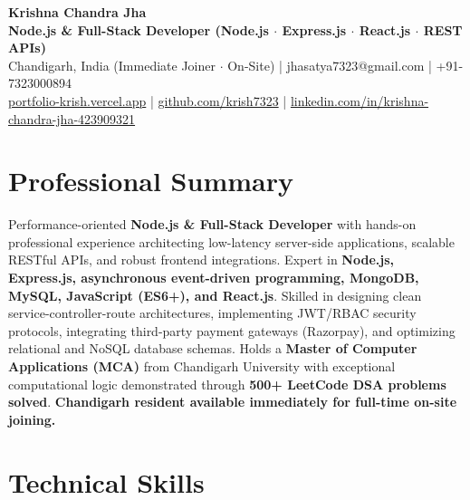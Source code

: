 \documentclass[a4paper,10pt]{article}
\begin{document}
\begin{center}

    {\LARGE \textbf{Krishna Chandra Jha}} \\[2.5pt]

    \textbf{Node.js \& Full-Stack Developer (Node.js $\cdot$ Express.js $\cdot$ React.js $\cdot$ REST APIs)} \\[3.5pt]

    Chandigarh, India (Immediate Joiner $\cdot$ On-Site)
    \quad | \quad
    jhasatya7323@gmail.com
    \quad | \quad
    +91-7323000894
    \\[2.5pt]

    \href{https://portfolio-ashen-alpha-dv0whhsamo.vercel.app/}{portfolio-krish.vercel.app}
    \quad | \quad
    \href{https://github.com/krish7323}{github.com/krish7323}
    \quad | \quad
    \href{https://linkedin.com/in/krishna-chandra-jha-423909321}
    {linkedin.com/in/krishna-chandra-jha-423909321}

\end{center}

\section*{Professional Summary}

Performance-oriented \textbf{Node.js \& Full-Stack Developer} with hands-on professional experience architecting low-latency server-side applications, scalable RESTful APIs, and robust frontend integrations. Expert in \textbf{Node.js, Express.js, asynchronous event-driven programming, MongoDB, MySQL, JavaScript (ES6+), and React.js}. Skilled in designing clean service-controller-route architectures, implementing JWT/RBAC security protocols, integrating third-party payment gateways (Razorpay), and optimizing relational and NoSQL database schemas. Holds a \textbf{Master of Computer Applications (MCA)} from Chandigarh University with exceptional computational logic demonstrated through \textbf{500+ LeetCode DSA problems solved}. \textbf{Chandigarh resident available immediately for full-time on-site joining.}

\section*{Technical Skills}
\end{document}
